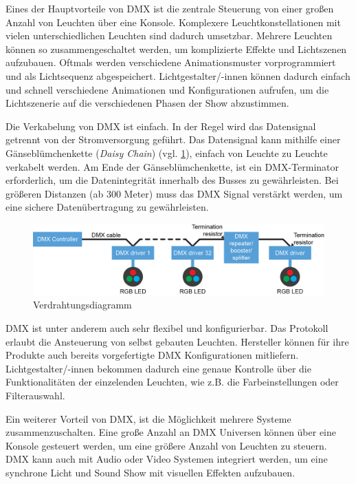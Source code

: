 Eines der Hauptvorteile von DMX ist die zentrale Steuerung von einer großen Anzahl von Leuchten über eine Konsole. Komplexere Leuchtkonstellationen mit vielen unterschiedlichen Leuchten sind dadurch umsetzbar. Mehrere Leuchten können so zusammengeschaltet werden, um komplizierte Effekte und Lichtszenen aufzubauen. Oftmals werden verschiedene Animationsmuster vorprogrammiert und als Lichtsequenz abgespeichert. Lichtgestalter/-innen können dadurch einfach und schnell verschiedene Animationen und Konfigurationen aufrufen, um die Lichtszenerie auf die verschiedenen Phasen der Show abzustimmen.

Die Verkabelung von DMX ist einfach. In der Regel wird das Datensignal getrennt von der Stromversorgung geführt. Das Datensignal kann mithilfe einer Gänseblümchenkette (\emph{Daisy Chain}) (vgl. \ref{fig:dmx_wiring diagram}), einfach von Leuchte zu Leuchte verkabelt werden. Am Ende der Gänseblümchenkette, ist ein DMX-Terminator erforderlich, um die Datenintegrität innerhalb des Busses zu gewährleisten. Bei größeren Distanzen (ab 300 Meter) muss das DMX Signal verstärkt werden, um eine sichere Datenübertragung zu gewährleisten.

\begin{figure}[H]
	\centering
	\includegraphics[width=.9\linewidth]{Pictures/dmxWiringDiagram}
	\caption{Verdrahtungsdiagramm \cite[S.64]{DMX_Wiring}}
	\label{fig:dmx_wiring diagram}
\end{figure}

DMX ist unter anderem auch sehr flexibel und konfigurierbar. Das Protokoll erlaubt die Ansteuerung von selbst gebauten Leuchten. Hersteller können für ihre Produkte auch bereits vorgefertigte DMX Konfigurationen mitliefern. Lichtgestalter/-innen bekommen dadurch eine genaue Kontrolle über die Funktionalitäten der einzelenden Leuchten, wie z.B. die Farbeinstellungen oder Filterauswahl.

Ein weiterer Vorteil von DMX, ist die Möglichkeit mehrere Systeme zusammenzuschalten. Eine große Anzahl an DMX Universen können über eine Konsole gesteuert werden, um eine größere Anzahl von Leuchten zu steuern. DMX kann auch mit Audio oder Video Systemen integriert werden, um eine synchrone Licht und Sound Show mit visuellen Effekten aufzubauen.

